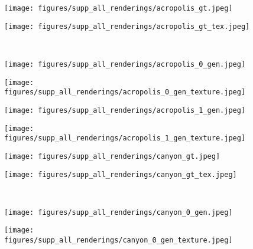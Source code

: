 \begin{figure*}[!h]
\centering
    \begin{subfigure}{.16\linewidth}
        \centering
        \texttt{[image: figures/supp\_all\_renderings/acropolis\_gt.jpeg]}
    \end{subfigure}
    \begin{subfigure}{.16\linewidth}
        \centering
        \texttt{[image: figures/supp\_all\_renderings/acropolis\_gt\_tex.jpeg]}
    \end{subfigure}
    \unskip\ \vrule\ 
    \begin{subfigure}{.16\linewidth}
        \centering
        \texttt{[image: figures/supp\_all\_renderings/acropolis\_0\_gen.jpeg]}
    \end{subfigure}
    \begin{subfigure}{.16\linewidth}
        \centering
        \texttt{[image: figures/supp\_all\_renderings/acropolis\_0\_gen\_texture.jpeg]}
    \end{subfigure}
    \begin{subfigure}{.16\linewidth}
        \centering
        \texttt{[image: figures/supp\_all\_renderings/acropolis\_1\_gen.jpeg]}
    \end{subfigure}
    \begin{subfigure}{.16\linewidth}
        \centering
        \texttt{[image: figures/supp\_all\_renderings/acropolis\_1\_gen\_texture.jpeg]}
    \end{subfigure}
    \vspace*{-5mm} 
    \begin{subfigure}{.16\linewidth}
        \centering
        \texttt{[image: figures/supp\_all\_renderings/canyon\_gt.jpeg]}
    \end{subfigure}
    \begin{subfigure}{.16\linewidth}
        \centering
        \texttt{[image: figures/supp\_all\_renderings/canyon\_gt\_tex.jpeg]}
    \end{subfigure}
    \unskip\ \vrule\ 
    \begin{subfigure}{.16\linewidth}
        \centering
        \texttt{[image: figures/supp\_all\_renderings/canyon\_0\_gen.jpeg]}
    \end{subfigure}
    \begin{subfigure}{.16\linewidth}
        \centering
        \texttt{[image: figures/supp\_all\_renderings/canyon\_0\_gen\_texture.jpeg]}

\end{subfigure}
\end{figure*}
